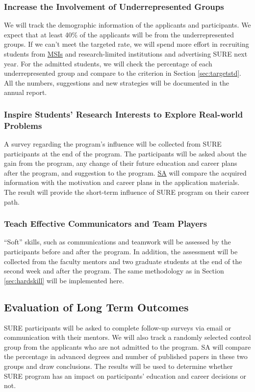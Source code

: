 \documentclass[11pt]{NSFamsart}
\newcommand{\SA}{\hyperlink{SAlink}{SA}\xspace}
\newcommand{\MSIs}{\hyperlink{MSIlink}{MSIs}\xspace}
\begin{document}
\subsubsection{Increase the Involvement of Underrepresented Groups}
We will track the demographic information of the applicants and participants. We expect that at least 40\% of the applicants will be from the underrepresented groups. If we can't meet the targeted rate, we will spend more effort in recruiting students from \MSIs and research-limited institutions and advertising SURE next year. For the admitted students, we will check the percentage of each underrepresented group and compare to the criterion in Section \ref{sec:targetstd}. All the numbers, suggestions and new strategies will be documented in the annual report. 

\subsubsection{
Inspire Students' Research Interests to Explore Real-world Problems}

A survey regarding the program's influence will be collected from SURE participants at the end of the program. The participants will be asked about the gain from the program, any change of their future education and career plans after the program, and suggestion to the program. \SA will compare the acquired information with the motivation and career plans in the application materials. The result will provide the short-term influence of SURE program on their career path.

\subsubsection{Teach Effective Communicators and Team Players}

``Soft'' skills, such as communications and teamwork will be assessed by the participants before and after the program. In addition, the assessment will be collected from the faculty mentors and two graduate students at the end of the second week and after the program. The same methodology as in Section \ref{sec:hardskill} will be implemented here. 


\subsection{Evaluation of Long Term Outcomes}

SURE participants will be
asked to complete follow-up surveys via email or communication with their mentors. We will also track a randomly selected control group from the applicants who are not admitted to the program. SA will compare the percentage in advanced degrees and number of published papers in these two groups and draw conclusions. The results will be used to determine whether SURE program has an impact on participants' education and career decisions or not.
\end{document}
